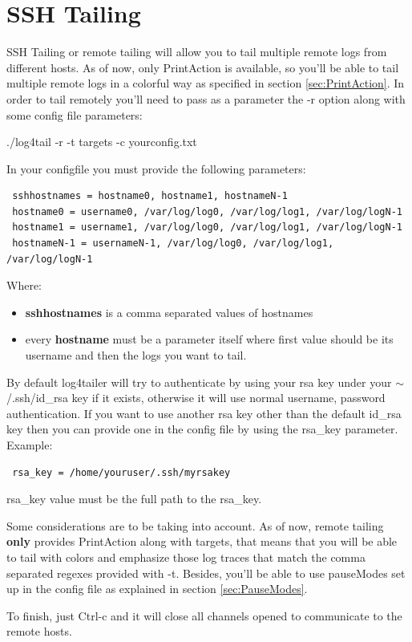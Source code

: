 \section{SSH Tailing}
SSH Tailing or remote tailing will allow you to tail multiple remote logs from different hosts. As of now, only 
PrintAction is available, so you'll be able to tail multiple remote logs in a colorful way as specified in 
section \ref{sec:PrintAction}. In order to tail remotely you'll need to pass as a parameter the -r option 
along with some config file parameters:
\begin{cmd}
 ./log4tail -r -t targets -c yourconfig.txt
\end{cmd}
In your configfile you must provide the following parameters:
\begin{verbatim}
 sshhostnames = hostname0, hostname1, hostnameN-1
 hostname0 = username0, /var/log/log0, /var/log/log1, /var/log/logN-1
 hostname1 = username1, /var/log/log0, /var/log/log1, /var/log/logN-1
 hostnameN-1 = usernameN-1, /var/log/log0, /var/log/log1, /var/log/logN-1
\end{verbatim}
Where:
\begin{itemize}
\item \textbf{sshhostnames} is a comma separated values of hostnames
\item every \textbf{hostname} must be a parameter itself where first value should be its username and 
then the logs you want to tail.
\end{itemize}
By default log4tailer will try to authenticate by using your rsa key under your
$\sim$/.ssh/id\_rsa key if it exists, otherwise it will use normal username, password
authentication. If you want to use another rsa key other than the default
id\_rsa key then you can provide one in the config file by using the rsa\_key
parameter. Example:
\begin{verbatim}
 rsa_key = /home/youruser/.ssh/myrsakey
\end{verbatim} 
rsa\_key value must be the full path to the rsa\_key.

Some considerations are to be taking into account. As of now, remote tailing \textbf{only} provides 
PrintAction along with targets, that means that you will be able to tail with colors and emphasize those log traces 
that match the comma separated regexes provided with -t. Besides, you'll be able to use 
pauseModes set up in the config file as explained in section \ref{sec:PauseModes}.

To finish, just Ctrl-c and it will close all channels opened to communicate to the remote hosts. 

